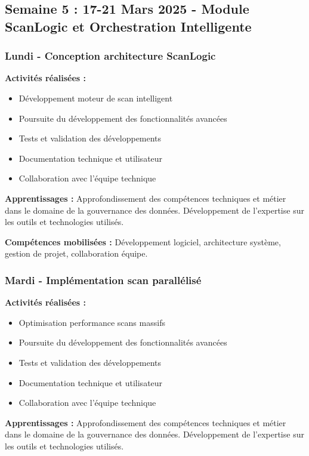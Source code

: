 \subsection{Semaine 5 : 17-21 Mars 2025 - Module ScanLogic et Orchestration Intelligente}

\subsubsection{Lundi - Conception architecture ScanLogic}

\textbf{Activités réalisées :}
\begin{itemize}
    \item Développement moteur de scan intelligent
    \item Poursuite du développement des fonctionnalités avancées
    \item Tests et validation des développements
    \item Documentation technique et utilisateur
    \item Collaboration avec l'équipe technique
\end{itemize}

\textbf{Apprentissages :}
Approfondissement des compétences techniques et métier dans le domaine de la gouvernance des données. Développement de l'expertise sur les outils et technologies utilisés.

\textbf{Compétences mobilisées :}
Développement logiciel, architecture système, gestion de projet, collaboration équipe.

\subsubsection{Mardi - Implémentation scan parallélisé}

\textbf{Activités réalisées :}
\begin{itemize}
    \item Optimisation performance scans massifs
    \item Poursuite du développement des fonctionnalités avancées
    \item Tests et validation des développements
    \item Documentation technique et utilisateur
    \item Collaboration avec l'équipe technique
\end{itemize}

\textbf{Apprentissages :}
Approfondissement des compétences techniques et métier dans le domaine de la gouvernance des données. Développement de l'expertise sur les outils et technologies utilisés.

